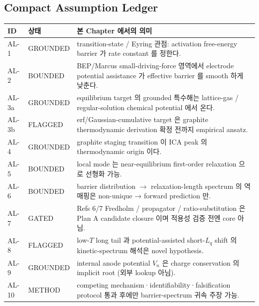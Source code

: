 \documentclass[11pt,a4paper]{article}
\begin{document}
\subsection{Compact Assumption Ledger}\label{sec:assumption_ledger}
\begin{longtable}{p{} p{} p{}}
\toprule ID & 상태 & 본 Chapter 에서의 의미 \\ \midrule \endhead
AL-1 & GROUNDED & transition-state / Eyring 관점: activation free-energy barrier 가 rate constant 를 정한다. \\
AL-2 & BOUNDED & BEP/Marcus small-driving-force 영역에서 electrode potential assistance 가 effective barrier 를 smooth 하게 낮춘다. \\
AL-3a & GROUNDED & equilibrium target 의 grounded 특수해는 lattice-gas / regular-solution chemical potential 에서 온다. \\
AL-3b & FLAGGED & erf/Gaussian-cumulative target 은 graphite thermodynamic derivation 확정 전까지 empirical ansatz. \\
AL-4 & GROUNDED & graphite staging transition 이 ICA peak 의 thermodynamic origin 이다. \\
AL-5 & BOUNDED & local mode 는 near-equilibrium first-order relaxation 으로 선형화 가능. \\
AL-6 & BOUNDED & barrier distribution $\to$ relaxation-length spectrum 의 역매핑은 non-unique → forward prediction 만. \\
AL-7 & GATED & Refs 6/7 Fredholm / propagator / ratio-substitution 은 Plan A candidate closure 이며 적용성 검증 전엔 core 아님. \\
AL-8 & FLAGGED & low-$T$ long tail 과 potential-assisted short-$L_q$ shift 의 kinetic-spectrum 해석은 novel hypothesis. \\
AL-9 & GROUNDED & internal anode potential $V_n$ 은 charge conservation 의 implicit root (외부 lookup 아님). \\
AL-10 & METHOD & competing mechanism·identifiability·falsification protocol 통과 후에만 barrier-spectrum 귀속 주장 가능. \\
\bottomrule
\end{longtable}

\end{document}
